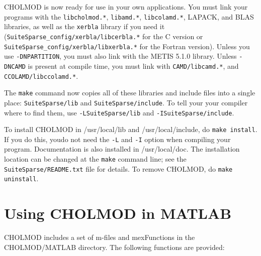 \documentclass[11pt]{article}
\begin{document}
CHOLMOD is now ready for use in your own applications.  You must link
your programs with the
{\tt libcholmod.*},
{\tt libamd.*},
{\tt libcolamd.*},
LAPACK,
and
BLAS libraries,
as well as the {\tt xerbla} library if you need it
({\tt SuiteSparse\_config/xerbla/libcerbla.*} for the C version or
\newline
 {\tt SuiteSparse\_config/xerbla/libxerbla.*} for the Fortran version).
Unless you use {\tt -DNPARTITION}, you must also link with the METIS 5.1.0
library.
Unless {\tt -DNCAMD} is present at compile time,
you must link with {\tt CAMD/libcamd.*}, and {\tt CCOLAMD/libccolamd.*}.

The {\tt make} command now copies all of these libraries and include files
into a single place: {\tt SuiteSparse/lib} and {\tt SuiteSparse/include}.
To tell your your compiler where to find them, use
{\tt -LSuiteSparse/lib} and {\tt -ISuiteSparse/include}.

To install CHOLMOD in /usr/local/lib and /usr/local/include, do
{\tt make install}.
If you do this, youdo not need the {\tt -L} and {\tt -I} option when compiling
your program.
Documentation is also installed in /usr/local/doc.
The installation location can be changed at the {\tt make} command line; see the
{\tt SuiteSparse/README.txt} file for details.
To remove CHOLMOD, do {\tt make uninstall}.

\newpage \section{Using CHOLMOD in MATLAB}

CHOLMOD includes a set of m-files and mexFunctions in the CHOLMOD/MATLAB
directory.  The following functions are provided:
\end{document}

